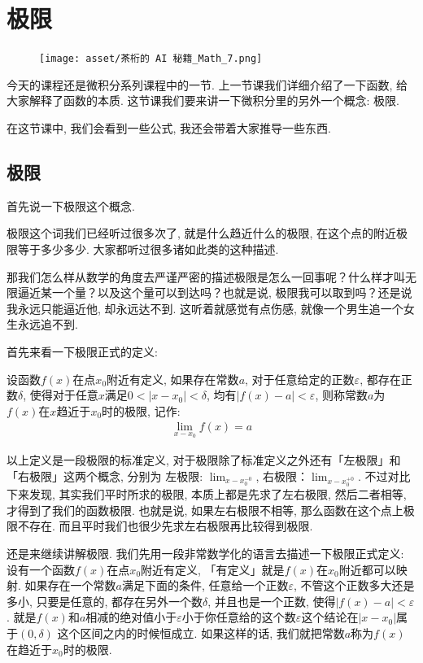 \chapter{极限}

\begin{figure}[ht]
  \centering
  \texttt{[image: asset/茶桁的 AI 秘籍\_Math\_7.png]}
\end{figure}

\newpage

今天的课程还是微积分系列课程中的一节. 上一节课我们详细介绍了一下函数, 给大家解释了函数的本质. 这节课我们要来讲一下微积分里的另外一个概念: 极限. 

在这节课中, 我们会看到一些公式, 我还会带着大家推导一些东西. 

\section{极限}

首先说一下极限这个概念. 

极限这个词我们已经听过很多次了, 就是什么趋近什么的极限, 在这个点的附近极限等于多少多少. 大家都听过很多诸如此类的这种描述. 

那我们怎么样从数学的角度去严谨严密的描述极限是怎么一回事呢？什么样才叫无限逼近某一个量？以及这个量可以到达吗？也就是说, 极限我可以取到吗？还是说我永远只能逼近他, 却永远达不到. 这听着就感觉有点伤感, 就像一个男生追一个女生永远追不到.

首先来看一下极限正式的定义: 

\begin{newquotation}
  设函数$f(x)$在点$x_0$附近有定义, 如果存在常数$a$, 对于任意给定的正数$\varepsilon$, 都存在正数$\delta$, 使得对于任意$x$满足$0<|x-x_0| < \delta$, 均有$|f(x)-a| < \varepsilon$, 则称常数$a$为$f(x)$在$x$趋近于$x_0$时的极限, 记作: 
  \begin{align*}
    \lim_{x-x_0}f(x) = a
  \end{align*}
\end{newquotation}

以上定义是一段极限的标准定义, 对于极限除了标准定义之外还有「左极限」和「右极限」这两个概念, 分别为 左极限: $\lim_{x-x_0^{-0}}$, 右极限：$\lim_{x-x_0^{+0}}$. 不过对比下来发现, 其实我们平时所求的极限, 本质上都是先求了左右极限, 然后二者相等, 才得到了我们的函数极限. 也就是说, 如果左右极限不相等, 那么函数在这个点上极限不存在. 而且平时我们也很少先求左右极限再比较得到极限. 

还是来继续讲解极限. 我们先用一段非常数学化的语言去描述一下极限正式定义: 设有一个函数$f(x)$在点$x_0$附近有定义, 「有定义」就是$f(x)$在$x_0$附近都可以映射. 如果存在一个常数$a$满足下面的条件, 任意给一个正数$\varepsilon$, 不管这个正数多大还是多小, 只要是任意的, 都存在另外一个数$\delta$, 并且也是一个正数, 使得$|f(x)-a|<\varepsilon$. 就是$f(x)$和$a$相减的绝对值小于$\varepsilon$小于你任意给的这个数$\varepsilon$这个结论在$|x-x_0|$属于$(0, \delta)$ 这个区间之内的时候恒成立. 如果这样的话, 我们就把常数$a$称为$f(x)$在趋近于$x_0$时的极限. 

